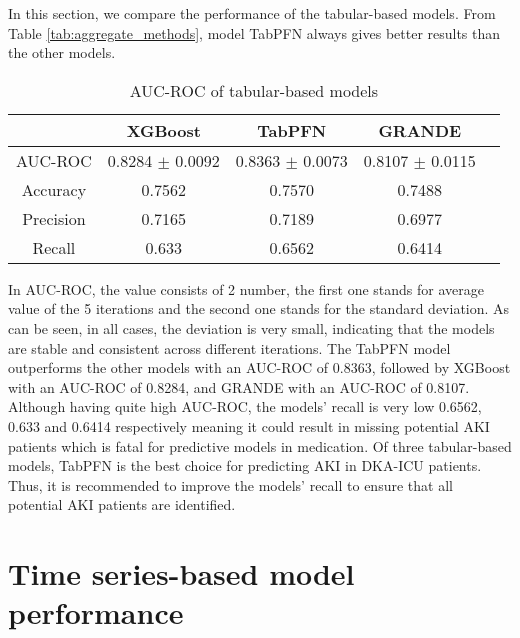 \documentclass[../main.tex]{subfiles}
\begin{document}
In this section, we compare the performance of the tabular-based models. 
From Table \ref{tab:aggregate_methods}, model TabPFN always gives better results than the other models.

\begin{table}[H]
    \centering
    \caption{AUC-ROC of tabular-based models}
    \label{tab:tabular_models}
    \begin{tabular}{|c|c|c|c|c|}
        \hline
        \textbf{} & 
        \textbf{XGBoost} & 
        \textbf{TabPFN} & 
        \textbf{GRANDE} \\
        \hline

        AUC-ROC & 
        0.8284 $\pm$ 0.0092 & 
        0.8363 $\pm$ 0.0073& 
        0.8107 $\pm$ 0.0115 \\

        Accuracy &
        0.7562 &
        0.7570 &
        0.7488 \\

        Precision &
        0.7165 &
        0.7189 &
        0.6977 \\

        Recall &
        0.633 &
        0.6562 &
        0.6414 \\

        \hline
    \end{tabular}
\end{table}

In AUC-ROC, the value consists of 2 number, the first one stands for average value of the 5 iterations and the second one stands for the standard deviation.
As can be seen, in all cases, the deviation is very small, indicating that the models are stable and consistent across different iterations.
The TabPFN model outperforms the other models with an AUC-ROC of 0.8363, followed by XGBoost with an AUC-ROC of 0.8284, and \gls{GRANDE} with an AUC-ROC of 0.8107.
Although having quite high AUC-ROC, the models' recall is very low 0.6562, 0.633 and 0.6414 respectively meaning it could result in missing potential \gls{AKI} patients which is fatal for predictive models in medication.
Of three tabular-based models, TabPFN is the best choice for predicting \gls{AKI} in \gls{DKA-ICU} patients. 
Thus, it is recommended to improve the models' recall to ensure that all potential \gls{AKI} patients are identified.


\section{Time series-based model performance}
\end{document}
